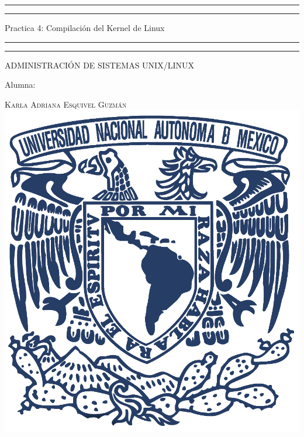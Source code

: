 \documentclass[a4paper, 11pt, oneside]{article}
\begin{document}
 

\begin{titlepage} 

	\centering 
	
	\scshape 
	
	\vspace*{\baselineskip} 
	
	
	
	\rule{\textwidth}{1.6pt}\vspace*{-\baselineskip}\vspace*{2pt} 
	\rule{\textwidth}{0.4pt} 
	
	\vspace{0.75\baselineskip} 
	
	{\LARGE Practica 4: Compilación del Kernel de Linux}	
	\vspace{0.75\baselineskip} 
	
	\rule{\textwidth}{0.4pt}\vspace*{-\baselineskip}\vspace{3.2pt}
	\rule{\textwidth}{1.6pt} 
	
	\vspace{2\baselineskip} 
	

	ADMINISTRACIÓN DE SISTEMAS UNIX/LINUX
	
	\vspace*{3\baselineskip} 
	
	
	
	Alumna:
	
	\vspace{0.5\baselineskip} 
	
	{\scshape\Large Karla Adriana Esquivel Guzmán \\} 
	\vspace{0.5\baselineskip} 
	\vfill
	\includegraphics{unam.jpg}
	

\end{titlepage}
\end{document}
